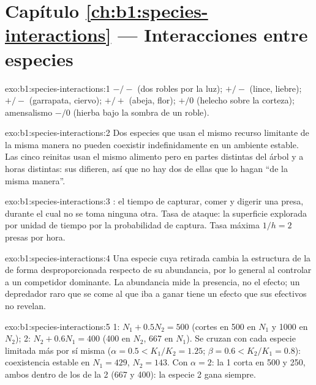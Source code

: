 \section*{Capítulo \ref{ch:b1:species-interactions} --- Interacciones entre especies}

\begin{solution}{exo:b1:species-interactions:1}
 $-/-$ (dos robles por la luz);  $+/-$ (lince,
liebre);  $+/-$ (garrapata, ciervo);  $+/+$ (abeja,
flor);  $+/0$ (helecho sobre la corteza); amensalismo $-/0$
(hierba bajo la sombra de un roble).
\end{solution}

\begin{solution}{exo:b1:species-interactions:2}
Dos especies que usan el mismo recurso limitante de la misma manera no
pueden coexistir indefinidamente en un ambiente estable. Las cinco reinitas
usan el mismo alimento pero en partes distintas del árbol y a horas
distintas: sus  difieren, así que no hay dos de ellas que lo hagan ``de
la misma manera''.
\end{solution}

\begin{solution}{exo:b1:species-interactions:3}
: el tiempo de capturar, comer y digerir una presa,
durante el cual no se toma ninguna otra. Tasa de ataque: la superficie
explorada por unidad de tiempo por la probabilidad de captura. Tasa máxima
$1/h = 2$ presas por hora.
\end{solution}

\begin{solution}{exo:b1:species-interactions:4}
Una especie cuya retirada cambia la estructura de la  de forma
desproporcionada respecto de su abundancia, por lo general al controlar a un
competidor dominante. La abundancia mide la presencia, no el efecto; un
depredador raro que se come al que iba a ganar tiene un efecto que sus
efectivos no revelan.
\end{solution}

\begin{solution}{exo:b1:species-interactions:5}
 1: $N_1 + 0.5 N_2 = 500$ (cortes en 500 en $N_1$ y 1000 en
$N_2$);  2: $N_2 + 0.6 N_1 = 400$ (400 en $N_2$, 667 en $N_1$).
Se cruzan con cada especie limitada más por sí misma ($\alpha = 0.5 <
K_1/K_2 = 1.25$; $\beta = 0.6 < K_2/K_1 = 0.8$): coexistencia estable
en $N_1 = 429$, $N_2 = 143$. Con $\alpha = 2$: la  1 corta en
500 y 250, ambos dentro de los de la  2 (667 y 400): la especie 2
gana siempre.
\end{solution}

